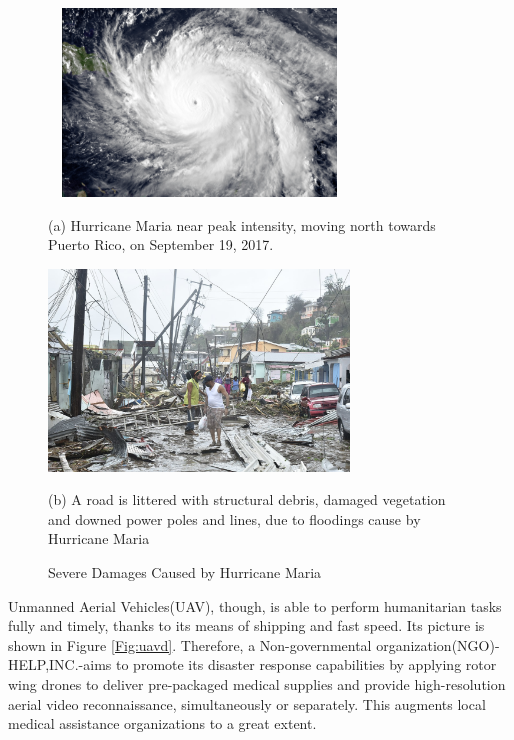 \documentclass{mcmthesis}
\begin{document}
\begin{figure}[htbp]
    \begin{minipage}{0.45\linewidth}
      \centerline{\includegraphics[height = 5.0cm,width=8cm]{figures/hurricanemaria.png}}
      \caption*{(a) Hurricane Maria near peak intensity, moving north towards Puerto Rico, on September 19, 2017.}
    \end{minipage}
    \hspace{0.5in}
    \begin{minipage}{0.45\linewidth}
      \centerline{\includegraphics[height=4.9
      cm,width=8cm]{figures/hurricanedamage.png}}
      \caption*{(b) A road is littered with structural debris, damaged vegetation and downed power poles and lines, due to floodings cause by Hurricane Maria}
    \end{minipage}
    \caption{Severe Damages Caused by Hurricane Maria\cite{HurricaneMariaWiki}}
    \label{Fig:hurr}
\end{figure}

Unmanned Aerial Vehicles(UAV), though, is able to perform humanitarian tasks fully and timely, thanks to its means of shipping and fast speed. Its picture is shown in Figure \ref{Fig:uavd}. Therefore, a Non-governmental organization(NGO)-HELP,INC.-aims to promote its disaster response capabilities by applying rotor wing drones to deliver pre-packaged medical supplies and provide high-resolution aerial video reconnaissance, simultaneously or separately. This augments local medical assistance organizations to a great extent.
\end{document}
